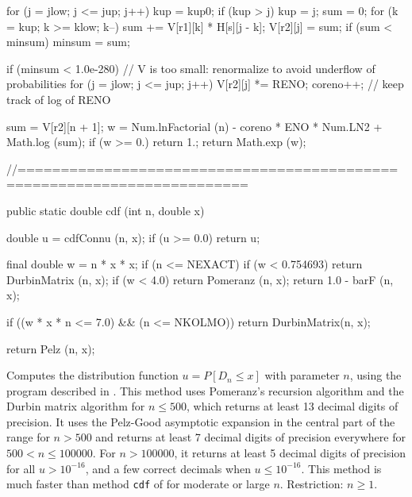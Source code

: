 \begin{code}
\begin{hide}
{{         for (j = jlow; j <= jup; j++) {
            kup = kup0;
            if (kup > j)
               kup = j;
            sum = 0;
            for (k = kup; k >= klow; k--)
               sum += V[r1][k] * H[s][j - k];
            V[r2][j] = sum;
            if (sum < minsum)
               minsum = sum;
         }

         if (minsum < 1.0e-280) {
            // V is too small: renormalize to avoid underflow of probabilities
            for (j = jlow; j <= jup; j++)
               V[r2][j] *= RENO;
            coreno++;              // keep track of log of RENO
         }
      }

      sum = V[r2][n + 1];
      w = Num.lnFactorial (n) - coreno * ENO * Num.LN2 + Math.log (sum);
      if (w >= 0.)
         return 1.;
      return Math.exp (w);
   }
   //========================================================================
\end{hide}

   public static double cdf (int n, double x)\begin{hide} {
      double u = cdfConnu (n, x);
      if (u >= 0.0)
         return u;

      final double w = n * x * x;
      if (n <= NEXACT) {
         if (w < 0.754693)
            return DurbinMatrix (n, x);
         if (w < 4.0)
            return Pomeranz (n, x);
         return 1.0 - barF (n, x);
      }

      if ((w * x * n <= 7.0) && (n <= NKOLMO))
         return DurbinMatrix(n, x);

      return Pelz (n, x);
   }\end{hide}
\end{code}
\begin{tabb}
  Computes the \ks{} distribution function $u = P[D_n \le x]$ with
 parameter $n$, using the program described in \cite{tSIM11a}.
 This method uses Pomeranz's recursion algorithm and the Durbin matrix algorithm
  \cite{tBRO08a,tPOM74a,tMAR03a} for
$n \le 500$, which returns at least 13 decimal digits of precision. It uses
the Pelz-Good asymptotic expansion \cite{tPEL76a} in the central part of
 the range for $n > 500$ and returns at least 7 decimal digits of precision
 everywhere for $500 < n \le 100000$. For $n > 100000$, it returns
 at least 5 decimal digits of precision for all $u > 10^{-16}$, and a
 few correct decimals when  $u \le 10^{-16}$.
 This method is much faster than method \texttt{cdf} of
 for moderate or large $n$.
Restriction:  $n\ge 1$.
 \end{tabb}
